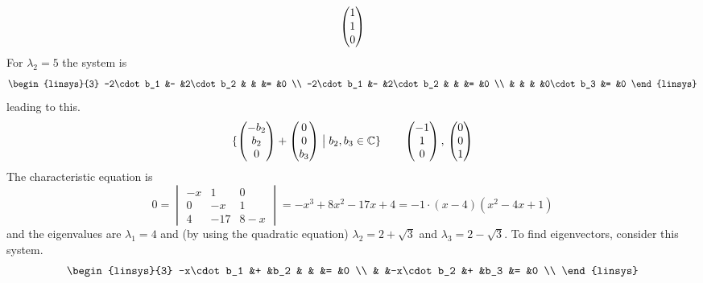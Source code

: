 \begin{exercises}
\begin{answer}
\begin{exparts}
\begin{equation*}
             \begin{pmatrix} 1 \\ 1 \\ 0 \end{pmatrix}
           \end{equation*}
           For $\lambda_2=5$ the system is 
           \begin{equation*}
             \begin{linsys}{3}
                -2\cdot b_1  &-  &2\cdot b_2   &   &   &=  &0  \\
               -2\cdot b_1   &-  &2\cdot b_2   &   &   &=  &0  \\
                             &   &             &   &0\cdot b_3 &= &0 
             \end{linsys}
           \end{equation*}
           leading to this.
           \begin{equation*}
             \mbox{$\{\begin{pmatrix} -b_2 \\ b_2 \\ 0 \end{pmatrix}+\begin{pmatrix} 0 \\ 0 \\ b_3 \end{pmatrix}
                   \bigm| b_2,b_3\in\mathbb{C}\}$}
             \qquad
             \begin{pmatrix} -1 \\ 1 \\ 0 \end{pmatrix},\,\begin{pmatrix} 0 \\ 0 \\ 1 \end{pmatrix}
           \end{equation*}
         \partsitem The characteristic equation is
           \begin{equation*}
             0=
             \begin{vmatrix}
              -x   &1    &0  \\
              0    &-x   &1  \\
              4    &-17  &8-x
             \end{vmatrix}
             =-x^3+8x^2-17x+4=-1\cdot(x-4)(x^2-4x+1)
           \end{equation*}
           and the eigenvalues are $\lambda_1=4$ and (by using the
           quadratic equation) $\lambda_2=2+\sqrt{3}$ and 
           $\lambda_3=2-\sqrt{3}$.
           To find eigenvectors, consider this system.
           \begin{equation*}
             \begin{linsys}{3}
               -x\cdot b_1  &+  &b_2          &   &               &=  &0  \\
                            &   &-x\cdot b_2  &+  &b_3            &=  &0  \\

\end{linsys}
\end{equation*}
\end{exparts}
\end{answer}
\end{exercises}

